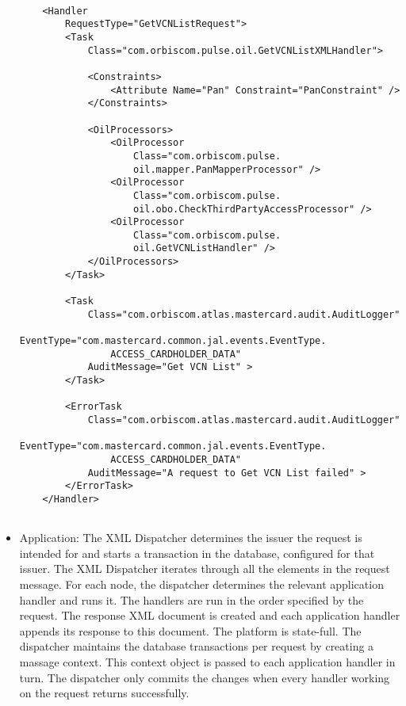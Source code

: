 \documentclass[a4paper, 11pt, titlepage]{article}
\begin{document}
\begin{itemize}
\begin{verbatim} 
 
    <Handler 
        RequestType="GetVCNListRequest"> 
        <Task 
            Class="com.orbiscom.pulse.oil.GetVCNListXMLHandler"> 
 
            <Constraints> 
                <Attribute Name="Pan" Constraint="PanConstraint" /> 
            </Constraints> 
 
            <OilProcessors> 
                <OilProcessor 
                    Class="com.orbiscom.pulse.
                    oil.mapper.PanMapperProcessor" /> 
                <OilProcessor 
                    Class="com.orbiscom.pulse.
                    oil.obo.CheckThirdPartyAccessProcessor" /> 
                <OilProcessor 
                    Class="com.orbiscom.pulse.
                    oil.GetVCNListHandler" /> 
            </OilProcessors> 
        </Task> 
 
        <Task 
            Class="com.orbiscom.atlas.mastercard.audit.AuditLogger" 
                EventType="com.mastercard.common.jal.events.EventType.
                ACCESS_CARDHOLDER_DATA" 
            AuditMessage="Get VCN List" > 
        </Task> 
         
        <ErrorTask 
            Class="com.orbiscom.atlas.mastercard.audit.AuditLogger" 
                EventType="com.mastercard.common.jal.events.EventType.
                ACCESS_CARDHOLDER_DATA" 
            AuditMessage="A request to Get VCN List failed" > 
        </ErrorTask> 
    </Handler> 
 
\end{verbatim} 
\item Application: The XML Dispatcher determines the issuer the request is intended for and starts a transaction in the database, configured for that issuer. The XML Dispatcher iterates through all the elements in the request message. For each node, the dispatcher determines the relevant application handler and runs it. The handlers are run in the order specified by the request. The response XML document is created and each application handler appends its response to this document. 
The platform is state-full. The dispatcher maintains the database transactions per request by creating a massage context. This context object is passed to each application handler in turn. The dispatcher only commits the changes when every handler working on the request returns successfully. \label{context}


\end{itemize}
\end{document}
